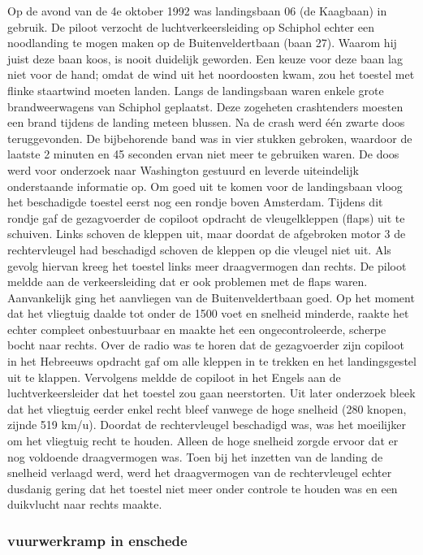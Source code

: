 Op de avond van de 4e oktober 1992 was landingsbaan 06 (de Kaagbaan) in gebruik. De piloot verzocht de luchtverkeersleiding op Schiphol echter een noodlanding te mogen maken op de Buitenveldertbaan (baan 27). Waarom hij juist deze baan koos, is nooit duidelijk geworden. Een keuze voor deze baan lag niet voor de hand; omdat de wind uit het noordoosten kwam, zou het toestel met flinke staartwind moeten landen. Langs de landingsbaan waren enkele grote brandweerwagens van Schiphol geplaatst. Deze zogeheten crashtenders moesten een brand tijdens de landing meteen blussen. Na de crash werd één zwarte doos teruggevonden. De bijbehorende band was in vier stukken gebroken, waardoor de laatste 2 minuten en 45 seconden ervan niet meer te gebruiken waren. De doos werd voor onderzoek naar Washington gestuurd en leverde uiteindelijk onderstaande informatie op.
Om goed uit te komen voor de landingsbaan vloog het beschadigde toestel eerst nog een rondje boven Amsterdam. Tijdens dit rondje gaf de gezagvoerder de copiloot opdracht de vleugelkleppen (flaps) uit te schuiven. Links schoven de kleppen uit, maar doordat de afgebroken motor 3 de rechtervleugel had beschadigd schoven de kleppen op die vleugel niet uit. Als gevolg hiervan kreeg het toestel links meer draagvermogen dan rechts. De piloot meldde aan de verkeersleiding dat er ook problemen met de flaps waren.
Aanvankelijk ging het aanvliegen van de Buitenveldertbaan goed. Op het moment dat het vliegtuig daalde tot onder de 1500 voet en snelheid minderde, raakte het echter compleet onbestuurbaar en maakte het een ongecontroleerde, scherpe bocht naar rechts. Over de radio was te horen dat de gezagvoerder zijn copiloot in het Hebreeuws opdracht gaf om alle kleppen in te trekken en het landingsgestel uit te klappen. Vervolgens meldde de copiloot in het Engels aan de luchtverkeersleider dat het toestel zou gaan neerstorten. Uit later onderzoek bleek dat het vliegtuig eerder enkel recht bleef vanwege de hoge snelheid (280 knopen, zijnde 519 km/u). Doordat de rechtervleugel beschadigd was, was het moeilijker om het vliegtuig recht te houden. Alleen de hoge snelheid zorgde ervoor dat er nog voldoende draagvermogen was. Toen bij het inzetten van de landing de snelheid verlaagd werd, werd het draagvermogen van de rechtervleugel echter dusdanig gering dat het toestel niet meer onder controle te houden was en een duikvlucht naar rechts maakte.

\cite{aviationsafety04101992airplaneCrashBijlmer}
\subsubsection{vuurwerkramp in enschede }
 
